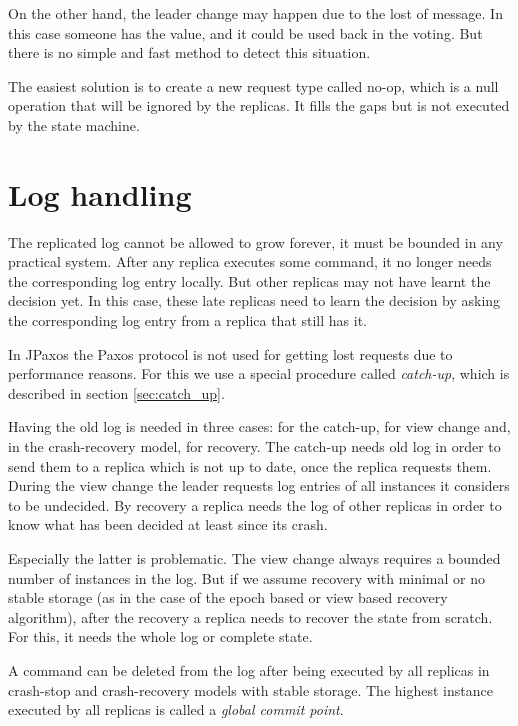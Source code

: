 On the other hand, the leader change may happen due to the lost of \alive message. In this case someone has the value, and it could be used back in the voting. But there is no simple and fast method to detect this situation.

The easiest solution is to create a new request type called no-op, which is a null operation that will be ignored by the replicas. It fills the gaps but is not executed by the state machine.

\section{Log handling}

The replicated log cannot be allowed to grow forever, it must be bounded in any practical system. After any replica executes some command, it no longer needs the corresponding log entry locally. But other replicas may not have learnt the decision yet. In this case, these late replicas need to learn the decision by asking the corresponding log entry from a replica that still has it.

In JPaxos the Paxos protocol is not used for getting lost requests due to performance reasons. For this we use a special procedure called \textit{catch-up}, which is described in section \ref{sec:catch_up}.

Having the old log is needed in three cases: for the catch-up, for view change and, in the crash-recovery model, for recovery.
The catch-up needs old log in order to send them to a replica which is not up to date, once the replica requests them.
During the view change the leader requests log entries of all instances it considers to be undecided.
By recovery a replica needs the log of other replicas in order to know what has been decided at least since its crash.

Especially the latter is problematic. The view change always requires a bounded number of instances in the log. But if we assume recovery with minimal or no stable storage (as in the case of the epoch based or view based recovery algorithm), after the recovery a replica needs to recover the state from scratch. For this, it needs the whole log or complete state.


A command can be deleted from the log after being executed by all replicas in crash-stop and crash-recovery models with stable storage. The highest instance executed by all replicas is called a \emph{global commit point}.

